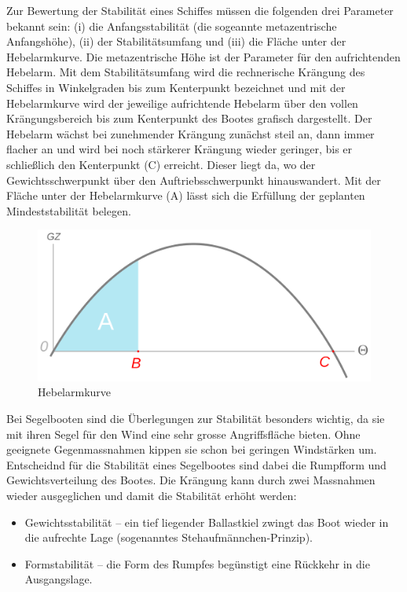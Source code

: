 Zur Bewertung der Stabilität eines Schiffes müssen die folgenden drei Parameter bekannt sein: (i) die Anfangsstabilität (die sogeannte metazentrische Anfangshöhe), (ii) der Stabilitätsumfang und (iii) die Fläche unter der Hebelarmkurve. Die metazentrische Höhe ist der Parameter für den aufrichtenden Hebelarm. Mit dem Stabilitätsumfang wird die rechnerische Krängung des Schiffes in Winkelgraden bis zum Kenterpunkt bezeichnet und mit der Hebelarmkurve wird der jeweilige aufrichtende Hebelarm über den vollen Krängungsbereich bis zum Kenterpunkt des Bootes grafisch dargestellt. Der Hebelarm wächst bei zunehmender Krängung zunächst steil an, dann immer flacher an und wird bei noch stärkerer Krängung wieder geringer, bis er schließlich den Kenterpunkt (C) erreicht. Dieser liegt da, wo der Gewichtsschwerpunkt über den Auftriebsschwerpunkt hinauswandert. Mit der Fläche unter der Hebelarmkurve (A) lässt sich die Erfüllung der geplanten Mindeststabilität belegen.  \cite{noauthor_stabilitat_2023}

\begin{figure}
    \centering
    \includegraphics[width=0.5\linewidth]{Stability_curve_NT.svg.png}
    \caption{Hebelarmkurve}
    \label{fig:enter-label}
\end{figure}
Bei Segelbooten sind die Überlegungen zur Stabilität besonders wichtig, da sie mit ihren Segel für den Wind eine sehr grosse Angriffsfläche bieten. Ohne geeignete Gegenmassnahmen kippen sie schon bei geringen Windstärken um. Entscheidnd für die Stabilität eines Segelbootes sind dabei die Rumpfform und Gewichtsverteilung des Bootes. Die Krängung kann durch zwei Massnahmen wieder ausgeglichen und damit die Stabilität erhöht werden: 
\begin{itemize}
    \item Gewichtsstabilität – ein tief liegender Ballastkiel zwingt das Boot wieder in die aufrechte Lage (sogenanntes Stehaufmännchen-Prinzip).
    \item Formstabilität – die Form des Rumpfes begünstigt eine Rückkehr in die Ausgangslage.
\end{itemize}

